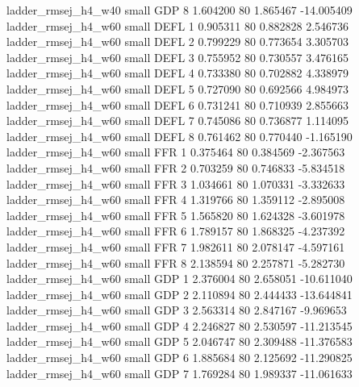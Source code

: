      ladder_rmsej_h4_w40      small      GDP                 8 1.604200 80       1.865467         -14.005409
     ladder_rmsej_h4_w60      small     DEFL                 1 0.905311 80       0.882828           2.546736
     ladder_rmsej_h4_w60      small     DEFL                 2 0.799229 80       0.773654           3.305703
     ladder_rmsej_h4_w60      small     DEFL                 3 0.755952 80       0.730557           3.476165
     ladder_rmsej_h4_w60      small     DEFL                 4 0.733380 80       0.702882           4.338979
     ladder_rmsej_h4_w60      small     DEFL                 5 0.727090 80       0.692566           4.984973
     ladder_rmsej_h4_w60      small     DEFL                 6 0.731241 80       0.710939           2.855663
     ladder_rmsej_h4_w60      small     DEFL                 7 0.745086 80       0.736877           1.114095
     ladder_rmsej_h4_w60      small     DEFL                 8 0.761462 80       0.770440          -1.165190
     ladder_rmsej_h4_w60      small      FFR                 1 0.375464 80       0.384569          -2.367563
     ladder_rmsej_h4_w60      small      FFR                 2 0.703259 80       0.746833          -5.834518
     ladder_rmsej_h4_w60      small      FFR                 3 1.034661 80       1.070331          -3.332633
     ladder_rmsej_h4_w60      small      FFR                 4 1.319766 80       1.359112          -2.895008
     ladder_rmsej_h4_w60      small      FFR                 5 1.565820 80       1.624328          -3.601978
     ladder_rmsej_h4_w60      small      FFR                 6 1.789157 80       1.868325          -4.237392
     ladder_rmsej_h4_w60      small      FFR                 7 1.982611 80       2.078147          -4.597161
     ladder_rmsej_h4_w60      small      FFR                 8 2.138594 80       2.257871          -5.282730
     ladder_rmsej_h4_w60      small      GDP                 1 2.376004 80       2.658051         -10.611040
     ladder_rmsej_h4_w60      small      GDP                 2 2.110894 80       2.444433         -13.644841
     ladder_rmsej_h4_w60      small      GDP                 3 2.563314 80       2.847167          -9.969653
     ladder_rmsej_h4_w60      small      GDP                 4 2.246827 80       2.530597         -11.213545
     ladder_rmsej_h4_w60      small      GDP                 5 2.046747 80       2.309488         -11.376583
     ladder_rmsej_h4_w60      small      GDP                 6 1.885684 80       2.125692         -11.290825
     ladder_rmsej_h4_w60      small      GDP                 7 1.769284 80       1.989337         -11.061633
